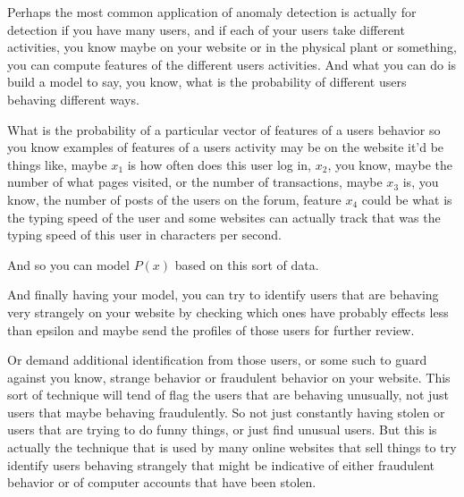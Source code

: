 \documentclass{article}
\begin{document}
\begin{example}
Perhaps the most common application of anomaly detection is actually for detection if you have many users, and if each of your users take different activities, 
you know maybe on your website or in the physical plant or something, you can compute features of the different users activities. And what you can do is build a model to say, you know,
what is the probability of different users behaving different ways.

What is the probability of a particular vector of features of a users behavior so you know examples of features of a users activity may be on the website it'd be things like,
maybe $x_1$ is how often does this user log in, 
$x_2$, you know, maybe the number of what pages visited, or the number of transactions, 
maybe $x_3$ is, you know, the number of posts of the users on the forum, 
feature $x_4$ could be what is the typing speed of the user and some websites can actually track that was the typing speed of this user in characters per second.

And so you can model $P(x)$ based on this sort of data.  

And finally having your model, you can try to identify users that are behaving very strangely on your website 
by checking which ones have probably effects less than epsilon and maybe send the profiles of those users for further review.  

Or demand additional identification from those users, or some such to guard against you know, strange behavior or fraudulent behavior on your website.  
This sort of technique will tend of flag the users that are behaving unusually, not just users that maybe behaving fraudulently.  
So not just constantly having stolen or users that are trying to do funny things, or just find unusual users.  
But this is actually the technique that is used by many online websites that sell things to try identify users behaving strangely that might be indicative of 
either fraudulent behavior or of computer accounts that have been stolen.
\end{example}
\end{document}
